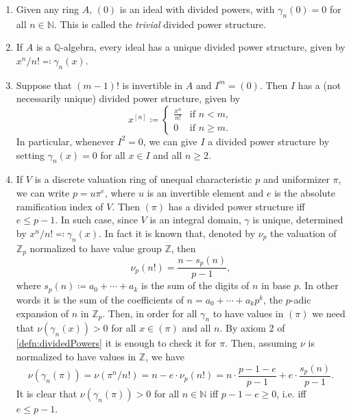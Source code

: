 \begin{ex}\leavevmode\vspace{-.2\baselineskip}
\begin{enumerate}\label{PDexamples}
	\item Given any ring $A$, $(0)$ is an ideal with divided powers,
		with $\gamma_n(0) = 0$ for all $n \in \mathbb{N}$.
		This is called the \emph{trivial} divided power structure.

	\item If $A$ is a $\mathbb{Q}$-algebra, every ideal has a unique
		divided power structure, given by $x^n/n! \eqqcolon \gamma_n(x)$.

	\item\label{PDEx:NilpotentIdeal} Suppose that $\left( m-1 \right)!$ is invertible in $A$ and 
		$I^m = (0)$.
		Then $I$ has a (not necessarily unique) divided power structure, given by
		\begin{equation*}
			x^{[n]} \coloneqq
			\begin{cases}
				\frac{ x^n }{ n! } & \text{if } n < m,\\
				0 & \text{if } n \geq m.
			\end{cases} 
		\end{equation*}
		In particular, whenever $I^2 = 0$, we can give $I$ a
		divided power structure by setting $\gamma_n(x) = 0$
		for all $x \in I$ and all $n \geq 2$.

	\item\label{PDex:DVR} If $V$ is a discrete valuation ring of unequal characteristic $p$
		and uniformizer $\pi$, we can write $p = u \pi^e$,
		where $u$ is an invertible element and $e$ is the 
		absolute ramification index of $V$.
		Then $\left( \pi \right)$ has a divided power structure iff $e \leq p-1$.
		In such case, since \(V\) is an integral domain, 
		$\gamma$ is unique, determined by $x^n/n! \eqqcolon \gamma_n(x)$.
		In fact it is known that, denoted by $\nu_p$ the valuation
		of $\mathbb{Z}_{p}$ normalized to have value group $\mathbb{Z}$,
		then
		\begin{equation*}
			\nu_p(n!) = 
			\frac{n - s_p(n)}{p-1}
		,\end{equation*}
		where $s_p(n) \coloneqq a_0 + \cdots + a_k$ is the sum of the
		digits of $n$ in base $p$. In other words it is the
		sum of the coefficients of $n = a_0 + \cdots + a_kp^k$,
		the $p$-adic expansion of $n$ in $\mathbb{Z}_{p}$.
		Then, in order for all $\gamma_n$ to have values in $(\pi)$
		we need that $\nu(\gamma_n(x)) > 0$ for all $x \in (\pi)$ and all \(n\).
		By axiom 2 of \cref{defn:dividedPowers}
		it is enough to check it for $\pi$.
		Then, assuming $\nu$ is normalized to have values in $\mathbb{Z}$,
		we have
		\begin{equation*}
			\nu(\gamma_n(\pi)) = \nu(\pi^n/n!) =
			n - e \cdot \nu_p(n!) =
			n \cdot \frac{p - 1 - e}{p - 1} + e \cdot \frac{s_p(n)}{p - 1}
		.\end{equation*}
		It is clear that $\nu(\gamma_n(\pi)) > 0$ for all $n \in \mathbb{N}$
		iff $p - 1 - e \geq 0$, i.e. iff $e \leq p - 1$.
\end{enumerate}
\end{ex} 


